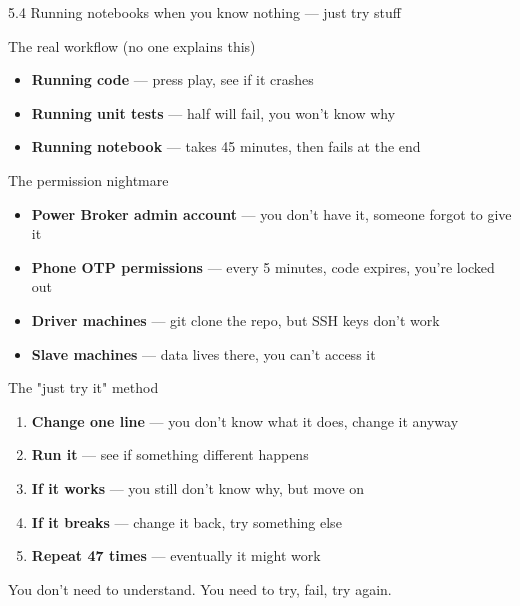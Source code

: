 \documentclass[aspectratio=169, 11pt]{beamer}
\begin{document}
\begin{frame}{5.4 Running notebooks when you know nothing — just try stuff}
	\begin{block}{The real workflow (no one explains this)}
		\tiny
		\begin{itemize}
			\item \textbf{Running code} — press play, see if it crashes
			\item \textbf{Running unit tests} — half will fail, you won't know why
			\item \textbf{Running notebook} — takes 45 minutes, then fails at the end
		\end{itemize}
	\end{block}
	
	\vspace{0.03cm}
	
	\begin{block}{The permission nightmare}
		\tiny
		\begin{itemize}
			\item \textbf{Power Broker admin account} — you don't have it, someone forgot to give it
			\item \textbf{Phone OTP permissions} — every 5 minutes, code expires, you're locked out
			\item \textbf{Driver machines} — git clone the repo, but SSH keys don't work
			\item \textbf{Slave machines} — data lives there, you can't access it
		\end{itemize}
	\end{block}
	
	\vspace{0.03cm}
	
	\begin{block}{The "just try it" method}
		\tiny
		\begin{enumerate}
			\item \textbf{Change one line} — you don't know what it does, change it anyway
			\item \textbf{Run it} — see if something different happens
			\item \textbf{If it works} — you still don't know why, but move on
			\item \textbf{If it breaks} — change it back, try something else
			\item \textbf{Repeat 47 times} — eventually it might work
		\end{enumerate}
	\end{block}
	
	\vspace{0.03cm}
	\tiny\alert{You don't need to understand. You need to try, fail, try again.}
\end{frame}
\end{document}

